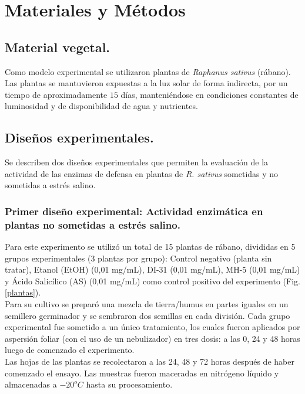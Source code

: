 \chapter{Materiales y Métodos }

\section{Material vegetal.}

Como modelo experimental se utilizaron plantas de \textit{Raphanus sativus} (r\'abano). Las plantas se mantuvieron expuestas a la luz solar de forma indirecta, por un tiempo de aproximadamente $15$ días, manteniéndose  en condiciones constantes de luminosidad y de disponibilidad de agua y nutrientes. 

\section{Diseños experimentales.}

Se describen dos dise\~nos experimentales que permiten la evaluaci\'on de la actividad de las enzimas de defensa en plantas de \textit{R. sativus} sometidas y no sometidas a estr\'es salino. 

\subsection{Primer dise\~no experimental: Actividad enzim\'atica en plantas no sometidas a estr\'es salino.} \label{d1}

Para este experimento se utilizó un total de 15 plantas de r\'abano, divididas en 5 grupos experimentales (3 plantas por grupo): Control negativo (planta sin tratar), Etanol (EtOH) (0,01 mg/mL), DI-31 (0,01 mg/mL), MH-5 (0,01 mg/mL) y Ácido Salicílico (AS) (0,01 mg/mL) como control positivo del experimento (Fig. \ref{plantas}). \\

Para su cultivo se prepar\'o una mezcla de tierra/humus en partes iguales en un semillero germinador y se sembraron dos semillas en cada división. Cada grupo experimental fue sometido a un único tratamiento, los cuales fueron aplicados por aspersión foliar (con el uso de un nebulizador) en tres dosis: a las 0, 24 y 48 horas luego de comenzado el experimento.\\

Las hojas de las plantas se recolectaron a las 24, 48 y 72 horas después de haber comenzado el ensayo. Las muestras fueron maceradas en nitrógeno líquido y almacenadas a $-20^oC$ hasta su procesamiento. \\

